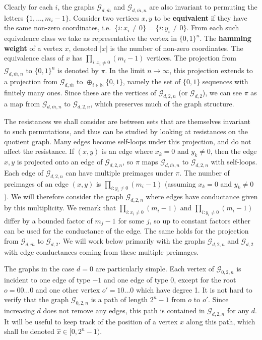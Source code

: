 \documentclass[12pt]{article}
\theoremstyle{definition}
\numberwithin{equation}{section}
\newcommand{\N}{\mathbb N}
\newcommand{\cG}{\mathcal{G}}
\renewcommand{\hat}{\widehat}
\newcommand{\mbar}{{\overline m}}
\begin{document}

Clearly for each $i$, the graphs $\cG_{d,\mbar}$ and $\cG_{d,\mbar,n}$ are also invariant to permuting the letters $\{1,\dots,m_i-1\}$.
Consider two vertices $x,y$ to be \textbf{equivalent} if they have the same non-zero coordinates, i.e.\ $\{ i : x_i \neq 0\} = \{i :y_i \neq0\}$.
From each such equivalence class we take as representative the vertex in $\{0,1\}^n$.
The \textbf{hamming weight} of a vertex $x$, denoted $|x|$ is the number of non-zero coordinates.
The equivalence class of $x$ has $\prod_{i : x_i\neq 0} (m_i-1)$ vertices.
The projection from $\cG_{d,\mbar,n}$ to $\{0,1\}^n$ is denoted by $\pi$.
In the limit $n\to\infty$, this projection extends to a projection from $\cG_{d,\mbar}$ to $\oplus_{i\in \N} \{0,1\}$, namely the set of $\{0,1\}$ sequences with finitely many ones.
Since these are the vertices of $\cG_{d,2,n}$ (or $\cG_{d,2}$), we can see $\pi$ as a map from $\cG_{d,\mbar,n}$ to $\cG_{d,2,n}$, which preserves much of the graph structure.


The resistances we shall consider are between sets that are themselves invariant to such permutations, and thus can be studied by looking at resistances on the quotient graph.
Many edges become self-loops under this projection, and do not affect the resistance.
If $(x,y)$ is an edge where $x_k=0$ and $y_k\neq 0$, then the edge $x,y$ is projected onto an edge of $\cG_{d,2,n}$, so $\pi$ maps $\cG_{d,\mbar,n}$ to $\cG_{d,2,n}$ with self-loops.
Each edge of $\cG_{d,2,n}$ can have multiple preimages under $\pi$.
The number of preimages of an edge $(x,y)$ is $\prod_{i: y_i\neq 0} (m_i-1)$ (assuming $x_k=0$ and $y_k\neq 0$).
We will therefore consider the graph $\cG_{d,2,n}$ where edges have conductance given by this multiplicity.
We remark that $\prod_{i: x_i\neq 0} (m_i-1)$ and $\prod_{i: y_i\neq 0} (m_i-1)$ differ by a bounded factor of $m_j-1$ for some $j$, so up to constant factors either can be used for the conductance of the edge.
The same holds for the projection from $\cG_{d,\mbar}$ to $\cG_{d,2}$.
We will work below primarily with the graphs $\cG_{d,2,n}$ and $\cG_{d,2}$ with edge conductances coming from these multiple preimages.

The graphs in the case $d=0$ are particularly simple.
Each vertex of $\cG_{0,2,n}$ is incident to one edge of type $-1$ and one edge of type $0$, except for the root $o = 00\dots0$ and one other vertex $o' = 10\dots0$ which have degree 1.
It is not hard to verify that the graph $\cG_{0,2,n}$ is a path of length $2^n-1$ from $o$ to $o'$.
Since increasing $d$ does not remove any edges, this path is contained in $\cG_{d,2,n}$ for any $d$.
It will be useful to
keep track of the position of a vertex $x$ along this path, which shall be
denoted $\hat x\in[0,2^n-1)$.
\end{document}
